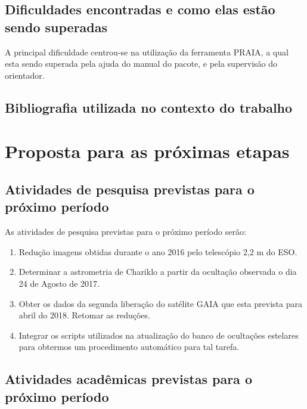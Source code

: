 \documentclass[a4paper, 11pt]{article}
\begin{document}
\subsection{Dificuldades encontradas e como elas estão sendo superadas}
A principal dificuldade centrou-se na utilização da ferramenta PRAIA, a qual esta sendo superada pela ajuda do manual do pacote, e pela supervisão do orientador.  

\subsection{Bibliografia utilizada no contexto do trabalho}

\section{Proposta para as próximas etapas}

\subsection{Atividades de pesquisa previstas para o próximo período}
As atividades de pesquisa previstas para o pr\'oximo per\'iodo ser\~ao:

\begin{enumerate}
\item Redução imagens obtidas durante o ano 2016 pelo telescópio 2,2 m do ESO.
\item Determinar a astrometria de Chariklo a partir da ocultação observada o dia 24 de Agosto de 2017. 
\item Obter os dados da segunda liberação do satélite GAIA que esta prevista para abril do 2018. Retomar as redu\c c\~oes.
\item Integrar os scripts utilizados na atualiza\c c\~ao do banco de oculta\c c\~oes estelares para obtermos um procedimento autom\'atico para tal tarefa.
\end{enumerate}
\subsection{Atividades acadêmicas previstas para o próximo período}
\end{document}

